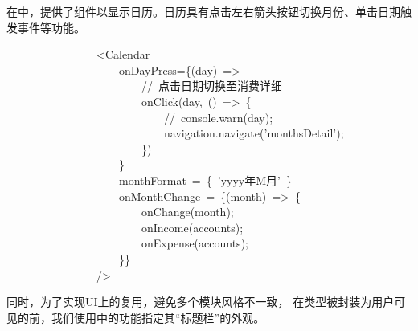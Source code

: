 \documentclass{article}
\begin{document}
在中，提供了组件以显示日历。日历具有点击左右箭头按钮切换月份、单击日期触发事件等功能。%
\begin{mdpre}%
\noindent~~~~~~~~~~~~~~~~\textless{}Calendar\\
~~~~~~~~~~~~~~~~~~~~onDayPress=\{(day)~=\textgreater{}\\
~~~~~~~~~~~~~~~~~~~~~~~~{//~点击日期切换至消费详细}\\
~~~~~~~~~~~~~~~~~~~~~~~~onClick(day,~()~=\textgreater{}~\{\\
~~~~~~~~~~~~~~~~~~~~~~~~~~~~{//~console.warn(day);}\\
~~~~~~~~~~~~~~~~~~~~~~~~~~~~navigation.navigate({'}{monthsDetail}{'});\\
~~~~~~~~~~~~~~~~~~~~~~~~\})\\
~~~~~~~~~~~~~~~~~~~~\}\\
~~~~~~~~~~~~~~~~~~~~monthFormat~=~\{~{'}{yyyy年M月}{'}~\}\\
~~~~~~~~~~~~~~~~~~~~onMonthChange~=~\{(month)~=\textgreater{}~\{\\
~~~~~~~~~~~~~~~~~~~~~~~~onChange(month);\\
~~~~~~~~~~~~~~~~~~~~~~~~onIncome(accounts);\\
~~~~~~~~~~~~~~~~~~~~~~~~onExpense(accounts);\\
~~~~~~~~~~~~~~~~~~~~\}\}\\
~~~~~~~~~~~~~~~~/\textgreater{}%
\end{mdpre}\noindent{}同时，为了实现UI上的复用，避免多个模块风格不一致，
在类型被封装为用户可见的前，我们使用中的功能指定其“标题栏”的外观。
\end{document}
